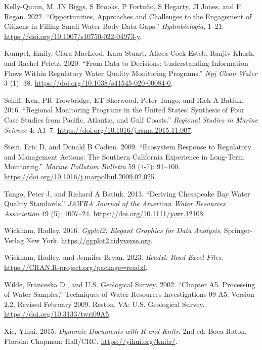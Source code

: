 \begin{CSLReferences}{1}{0}
\leavevmode{}%
Kelly-Quinn, M, JN Biggs, S Brooks, P Fortuño, S Hegarty, JI Jones, and F Regan. 2022. {``Opportunities, Approaches and Challenges to the Engagement of Citizens in Filling Small Water Body Data Gaps.''} \emph{Hydrobiologia}, 1--21. \url{https://doi.org/10.1007/s10750-022-04973-y}.

\leavevmode{}%
Kumpel, Emily, Clara MacLeod, Kara Stuart, Alicea Cock-Esteb, Ranjiv Khush, and Rachel Peletz. 2020. {``From Data to Decisions: Understanding Information Flows Within Regulatory Water Quality Monitoring Programs.''} \emph{Npj Clean Water} 3 (1): 38. \url{https://doi.org/10.1038/s41545-020-00084-0}.

\leavevmode{}%
Schiff, Ken, PR Trowbridge, ET Sherwood, Peter Tango, and Rich A Batiuk. 2016. {``Regional Monitoring Programs in the United States: Synthesis of Four Case Studies from Pacific, Atlantic, and Gulf Coasts.''} \emph{Regional Studies in Marine Science} 4: A1--7. \url{https://doi.org/10.1016/j.rsma.2015.11.007}.

\leavevmode{}%
Stein, Eric D, and Donald B Cadien. 2009. {``Ecosystem Response to Regulatory and Management Actions: The Southern California Experience in Long-Term Monitoring.''} \emph{Marine Pollution Bulletin} 59 (4-7): 91--100. \url{https://doi.org/10.1016/j.marpolbul.2009.02.025}.

\leavevmode{}%
Tango, Peter J, and Richard A Batiuk. 2013. {``Deriving {C}hesapeake {B}ay Water Quality Standards.''} \emph{JAWRA Journal of the American Water Resources Association} 49 (5): 1007--24. \url{https://doi.org/10.1111/jawr.12108}.

\leavevmode{}%
Wickham, Hadley. 2016. \emph{Ggplot2: Elegant Graphics for Data Analysis}. Springer-Verlag New York. \url{https://ggplot2.tidyverse.org}.

\leavevmode{}%
Wickham, Hadley, and Jennifer Bryan. 2023. \emph{Readxl: Read Excel Files}. \url{https://CRAN.R-project.org/package=readxl}.

\leavevmode{}%
Wilde, Franceska D., and U.S. Geological Survey. 2002. {``Chapter A5. Processing of Water Samples.''} Techniques of Water-Resources Investigations 09-A5. Version 2.2, Revised February 2009. Reston, VA: U.S. Geological Survey. \url{https://doi.org/10.3133/twri09A5}.

\leavevmode{}%
Xie, Yihui. 2015. \emph{Dynamic Documents with {R} and Knitr}. 2nd ed. Boca Raton, Florida: Chapman; Hall/CRC. \url{https://yihui.org/knitr/}.

\end{CSLReferences}

